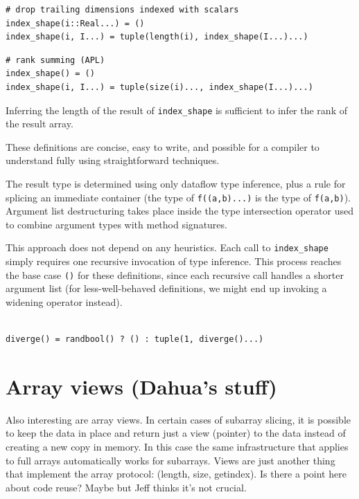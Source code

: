 \documentclass[preprint]{sigplanconf}
\begin{document}
\begin{verbatim}
# drop trailing dimensions indexed with scalars
index_shape(i::Real...) = ()
index_shape(i, I...) = tuple(length(i), index_shape(I...)...)
\end{verbatim}

\begin{verbatim}
# rank summing (APL)
index_shape() = ()
index_shape(i, I...) = tuple(size(i)..., index_shape(I...)...)
\end{verbatim}

Inferring the length of the result of \texttt{index\_shape} is sufficient to
infer the rank of the result array.

These definitions are concise, easy to write, and possible for a compiler to
understand fully using straightforward techniques.



The result type is determined using only dataflow type inference, plus a rule
for splicing an immediate container (the type of \texttt{f((a,b)...)} is the
type of \texttt{f(a,b)}). Argument list destructuring takes place inside the
type intersection operator used to combine argument types with method
signatures.

This approach does not depend on any heuristics. Each call to
\texttt{index\_shape} simply requires one recursive invocation of type
inference. This process reaches the base case \texttt{()} for these
definitions, since each recursive call handles a shorter argument list (for
less-well-behaved definitions, we might end up invoking a widening operator
instead).


\begin{verbatim}

diverge() = randbool() ? () : tuple(1, diverge()...)

\end{verbatim}

\section{Array views (Dahua's stuff)}

Also interesting are array views. In certain cases of subarray slicing, it is
possible to keep the data in place and return just a view (pointer) to the
data instead of creating a new copy in memory. In this case the same
infrastructure that applies to full arrays automatically works for subarrays.
Views are just another thing that implement the array protocol: (length, size,
getindex). Is there a point here about code reuse? Maybe but Jeff thinks it's
not crucial.
\end{document}

